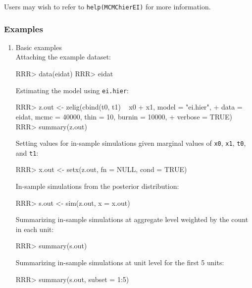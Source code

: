 \noindent Users may wish to refer to \texttt{help(MCMChierEI)} for more information.



\subsubsection{Examples}

\begin{enumerate}
 \item Basic examples \\
 Attaching the example dataset:
\begin{Schunk}
\begin{Sinput}
RRR>  data(eidat)
RRR>  eidat
\end{Sinput}
\end{Schunk}
Estimating the model using \texttt{ei.hier}:
\begin{Schunk}
\begin{Sinput}
RRR> z.out <- zelig(cbind(t0, t1) ~ x0 + x1, model = "ei.hier", 
+                  data = eidat, mcmc = 40000, thin = 10, burnin = 10000, 
+                  verbose = TRUE)
RRR>  summary(z.out)
\end{Sinput}
\end{Schunk}

Setting values for in-sample simulations given marginal values 
of {\tt x0}, {\tt x1}, {\tt t0}, and {\tt t1}:
\begin{Schunk}
\begin{Sinput}
RRR>  x.out <- setx(z.out, fn = NULL, cond = TRUE)
\end{Sinput}
\end{Schunk}

In-sample simulations from the posterior distribution:
\begin{Schunk}
\begin{Sinput}
RRR>  s.out <- sim(z.out, x = x.out)
\end{Sinput}
\end{Schunk}
Summarizing in-sample simulations at aggregate level 
weighted by the count in each unit:
\begin{Schunk}
\begin{Sinput}
RRR> summary(s.out)
\end{Sinput}
\end{Schunk}
Summarizing in-sample simulations at unit level for the first 5 units:
\begin{Schunk}
\begin{Sinput}
RRR> summary(s.out, subset = 1:5)
\end{Sinput}
\end{Schunk}

\end{enumerate}
\clearpage
